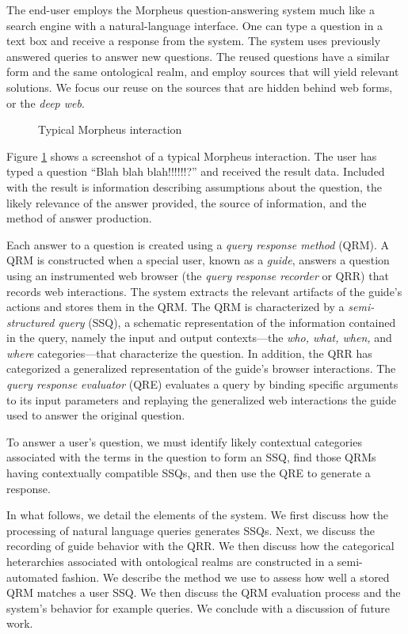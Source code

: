 
The end-user employs the Morpheus question-answering system much like a search engine with a natural-language interface. One can type a question in a text box and receive a response from the system. The system uses previously answered queries to answer new questions.  The reused questions have a similar form and the same ontological realm, and employ sources that will yield relevant solutions.  We focus our reuse on the sources that are hidden behind web forms, or the \emph{deep web}.

\begin{figure}
\caption{Typical Morpheus interaction}
\label{fig:screenshot}
\end{figure}

Figure \ref{fig:screenshot} shows a screenshot of a typical Morpheus
interaction. The user has typed a question ``Blah blah blah!!!!!!?'' and
received the result data.  Included with the result is information describing assumptions about the question, the likely relevance of the answer provided,
the source of information, and the method of answer production.

Each answer to a question is created using a \emph{query response
  method} (QRM). A QRM is constructed when a special user, known as a
\emph{guide}, answers a question using an instrumented web browser (the
\emph{query response recorder} or QRR) that records web
interactions. The system extracts the relevant artifacts of the
guide's actions and stores them in the QRM. The QRM is characterized
by a \emph{semi-structured query} (SSQ), a schematic representation of
the information contained in the query, namely the input and output
contexts---the \emph{who, what, when,} and \emph{where}
categories---that characterize the question.  In addition, the QRR has categorized a generalized representation of the guide's browser
interactions.  The \emph{query response evaluator} (QRE) evaluates a
query by binding specific arguments to its input parameters and
replaying the generalized web interactions the guide used to answer
the original question.

To answer a user's question, we must identify likely contextual
categories associated with the terms in the question to form an SSQ,
find those QRMs having contextually compatible SSQs, and then use the QRE to
generate a response.


In what follows, we detail the elements of the system.  We first
discuss how the processing of natural language queries generates SSQs.
Next, we discuss the recording of guide behavior with the QRR.  We
then discuss how the categorical heterarchies associated with
ontological realms are constructed in a semi-automated fashion.  We
describe the method we use to assess how well a stored QRM matches a
user SSQ.  We then discuss the QRM evaluation process and the
system's behavior for example queries. We conclude with a discussion of
future work.
 
